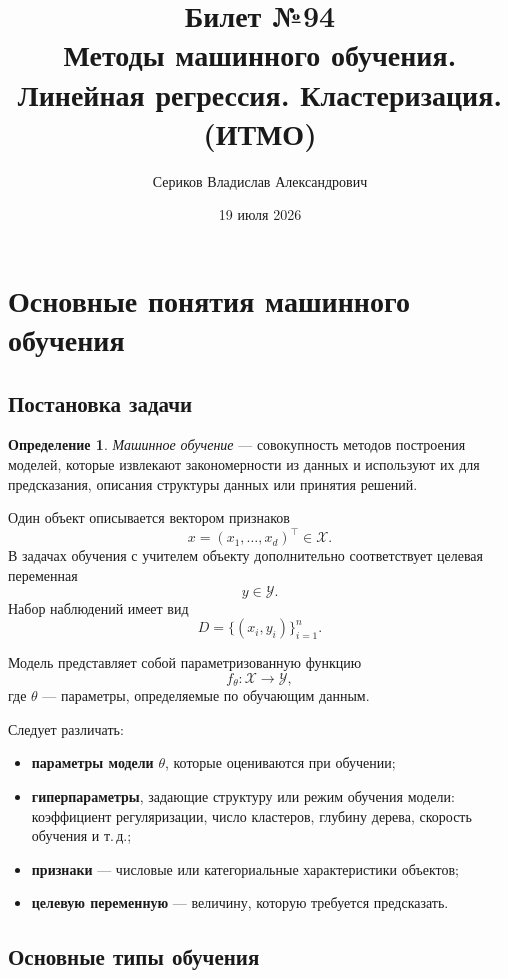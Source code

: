 \documentclass[12pt,a4paper]{article}
\title{Билет №94 \\ \small Методы машинного обучения. Линейная регрессия. Кластеризация. (ИТМО)}
\author{Сериков Владислав Александрович}
\date{19 июля 2026}
\theoremstyle{definition}
\newtheorem{definition}[theorem]{Определение}
\theoremstyle{remark}
\begin{document}
\maketitle
\tableofcontents
\newpage

\section{Основные понятия машинного обучения}

\subsection{Постановка задачи}

\begin{definition}
\emph{Машинное обучение} --- совокупность методов построения моделей,
которые извлекают закономерности из данных и используют их для предсказания,
описания структуры данных или принятия решений.
\end{definition}

Один объект описывается вектором признаков
\[
    x=(x_1,\ldots,x_d)^\top\in\mathcal{X}.
\]
В задачах обучения с учителем объекту дополнительно соответствует целевая
переменная
\[
    y\in\mathcal{Y}.
\]
Набор наблюдений имеет вид
\[
    D=\{(x_i,y_i)\}_{i=1}^{n}.
\]

Модель представляет собой параметризованную функцию
\[
    f_\theta\colon \mathcal{X}\to\mathcal{Y},
\]
где $\theta$ --- параметры, определяемые по обучающим данным.

Следует различать:

\begin{itemize}
    \item \textbf{параметры модели} $\theta$, которые оцениваются при обучении;
    \item \textbf{гиперпараметры}, задающие структуру или режим обучения модели:
          коэффициент регуляризации, число кластеров, глубину дерева,
          скорость обучения и т.\,д.;
    \item \textbf{признаки} --- числовые или категориальные характеристики объектов;
    \item \textbf{целевую переменную} --- величину, которую требуется предсказать.
\end{itemize}

\subsection{Основные типы обучения}
\end{document}
